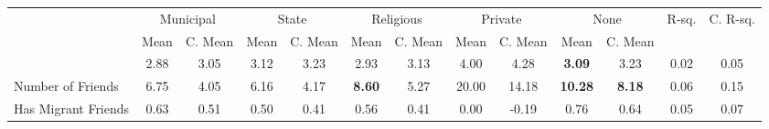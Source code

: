 \begin{tabular}{l c c c c c c c c c c c c}
\toprule
& \multicolumn{2}{c}{Municipal} & \multicolumn{2}{c}{State} & \multicolumn{2}{c}{Religious} & \multicolumn{2}{c}{Private} & \multicolumn{2}{c}{None} & R-sq. & C. R-sq. \\
& \scriptsize Mean & \scriptsize C. Mean & \scriptsize Mean & \scriptsize C. Mean & \scriptsize Mean & \scriptsize C. Mean & \scriptsize Mean & \scriptsize C. Mean & \scriptsize Mean & \scriptsize C. Mean & & \\
\midrule
&      2.88 & 3.05 &      3.12 & 3.23 &      2.93 & 3.13 &      4.00 & 4.28 & \textbf{     3.09} & 3.23 &      0.02 &      0.05 \\
Number of Friends &      6.75 & 4.05 &      6.16 & 4.17 & \textbf{     8.60} & 5.27 &     20.00 & 14.18 & \textbf{    10.28} & \textbf{     8.18} &      0.06 &      0.15 \\
Has Migrant Friends &      0.63 & 0.51 &      0.50 & 0.41 &      0.56 & 0.41 &      0.00 & -0.19 &      0.76 & 0.64 &      0.05 &      0.07 \\
\bottomrule
\end{tabular}
